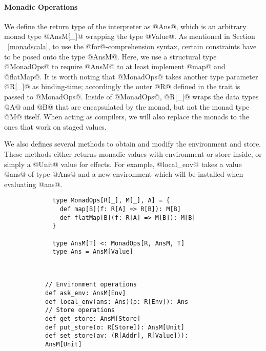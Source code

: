 \paragraph{Monadic Operations} We define the return type of the interpreter as
@Ans@, which is an arbitrary monad type @AnsM[_]@ wrapping the type @Value@. 
As mentioned in Section ~\ref{monadscala}, to use the @for@-comprehension
syntax, certain constraints have to be posed onto the type @AnsM@. Here, we use a
structural type @MonadOps@ to require @AnsM@ to at least implement @map@ and
@flatMap@. It is worth noting that @MonadOps@ takes another type parameter
@R[_]@ as binding-time; accordingly the outer @R@ defined in the trait is passed
to @MonadOps@. Inside of @MonadOps@, @R[_]@ wraps the data types @A@ and @B@ that are
encapsulated by the monad, but not the monad type @M@ itself. When acting as
compilers, we will also replace the monads to the ones that work on staged
values.

We also defines several methods to obtain and modify the environment and store.
These methods either returns monadic values with environment or store inside, or
simply a @Unit@ value for effects. For example, @local_env@ takes a value @ans@ of
type @Ans@ and a new environment which will be installed when evaluating @ans@.

\vspace{-1em}
\begin{figure}[h!]
  \centering
  \begin{subfigure}[b]{0.45\textwidth}
    \begin{lstlisting}
  type MonadOps[R[_], M[_], A] = {
    def map[B](f: R[A] => R[B]): M[B]
    def flatMap[B](f: R[A] => M[B]): M[B]
  }
  
  type AnsM[T] <: MonadOps[R, AnsM, T]
  type Ans = AnsM[Value]
    \end{lstlisting}
  \end{subfigure}
  ~
  \begin{subfigure}[b]{0.55\textwidth}
    \begin{lstlisting}
// Environment operations
def ask_env: AnsM[Env]
def local_env(ans: Ans)(ρ: R[Env]): Ans
// Store operations
def get_store: AnsM[Store]
def put_store(σ: R[Store]): AnsM[Unit]
def set_store(av: (R[Addr], R[Value])): AnsM[Unit]
    \end{lstlisting}
  \end{subfigure}
\end{figure}
\vspace{-1em}

